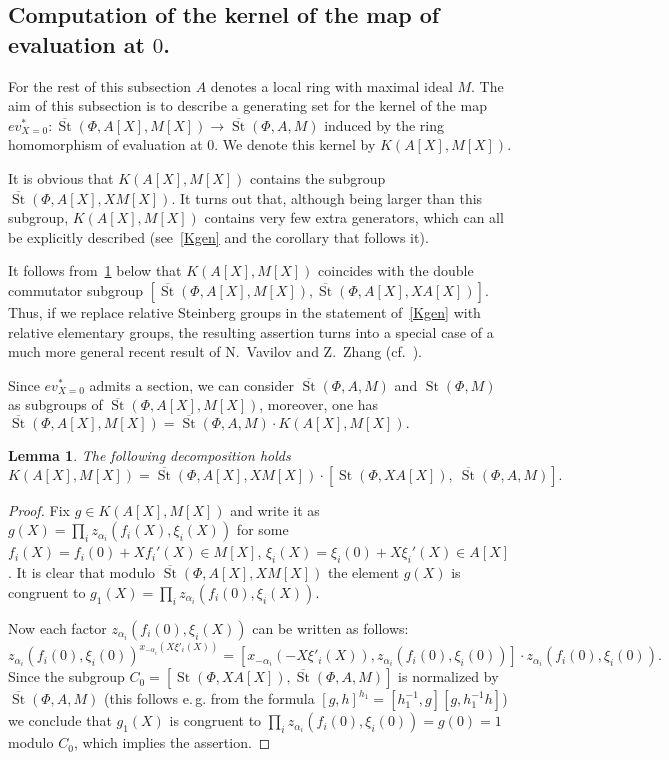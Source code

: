 \documentclass[oneside, 8pt]{amsart}
\newtheorem{lemma}{Lemma}
\theoremstyle{remark}
\theoremstyle{definition}
\numberwithin{lemma}{section}
\numberwithin{prop}{section}
\numberwithin{corollary}{section}
\numberwithin{externaltheorem}{section}
\DeclareMathOperator{\St}{St}
\numberwithin{equation}{section}
\begin{document}
\subsection{Computation of the kernel of the map of evaluation at $0$.}
For the rest of this subsection $A$ denotes a local ring with maximal ideal $M$.
The aim of this subsection is to describe a generating set for the kernel of the map $ev_{X=0}^*\colon\overline{\St}(\Phi, A[X], M[X]) \to \overline{\St}(\Phi, A, M)$
induced by the ring homomorphism of evaluation at $0$. We denote this kernel by $K(A[X], M[X])$.

It is obvious that $K(A[X], M[X])$ contains the subgroup $\overline{\St}(\Phi, A[X], XM[X])$. It turns out that, although being larger than this subgroup, $K(A[X], M[X])$ contains very few extra generators, which can all be explicitly described (see~\cref{Kgen} and the corollary that follows it). 

It follows from~\cref{Kdecomp1} below that $K(A[X], M[X])$ coincides with the double commutator subgroup $[\overline{\St}(\Phi, A[X], M[X]), \overline{\St}(\Phi, A[X], XA[X])].$ Thus, if we replace relative Steinberg groups in the statement of~\cref{Kgen} with relative elementary groups, the resulting assertion turns into a special case of a much more general recent result of N.~Vavilov and Z.~Zhang (cf.~\cite[Theorem~1]{VZ18}).

Since $ev_{X=0}^*$ admits a section, we can consider $\overline{\St}(\Phi, A, M)$ and $\St(\Phi, M)$ as subgroups of $\overline{\St}(\Phi, A[X], M[X])$,
 moreover, one has $\overline{\St}(\Phi, A[X], M[X]) = \overline{\St}(\Phi, A, M) \cdot K(A[X], M[X]).$
\begin{lemma} \label{Kdecomp1} The following decomposition holds
 \[ K(A[X], M[X]) = \overline{\St}(\Phi, A[X], XM[X]) \cdot \left[\St(\Phi, XA[X]),\ \overline{\St}(\Phi, A, M)\right].\] \end{lemma}
\begin{proof} Fix $g \in K(A[X], M[X])$ and write it as $g(X) = \prod_i z_{\alpha_i}(f_i(X), \xi_i(X))$ for some $f_i(X) = f_i(0) + Xf_i'(X) \in M[X]$, $\xi_i(X) = \xi_i(0) + X\xi_i'(X) \in A[X]$.
 It is clear that modulo $\overline{\St}(\Phi, A[X], XM[X])$ the element $g(X)$ is congruent to $g_1(X) = \prod_i z_{\alpha_i}(f_i(0), \xi_i(X)).$ 
 
 Now each factor $z_{\alpha_i}(f_i(0), \xi_i(X))$ can be written as follows:
 \[z_{\alpha_i}(f_i(0), \xi_i(0))^{x_{-\alpha_i}(X\xi'_i(X))} = [x_{-\alpha_i}(-X\xi'_i(X)), z_{\alpha_i}(f_i(0), \xi_i(0))] \cdot z_{\alpha_i}(f_i(0), \xi_i(0)).\]
 Since the subgroup $C_0 = \left[\St(\Phi, XA[X]), \overline{\St}(\Phi, A, M)\right]$ is normalized by $\overline{\St}(\Phi, A, M)$ 
 (this follows e.\,g. from the formula $[g, h]^{h_1} = [h_1^{-1}, g][g, h_1^{-1}h]$) we conclude that $g_1(X)$ is congruent to $\prod_i z_{\alpha_i}(f_i(0), \xi_i(0)) = g(0) = 1$ modulo $C_0$,
 which implies the assertion. \qedhere \end{proof}
\end{document}
